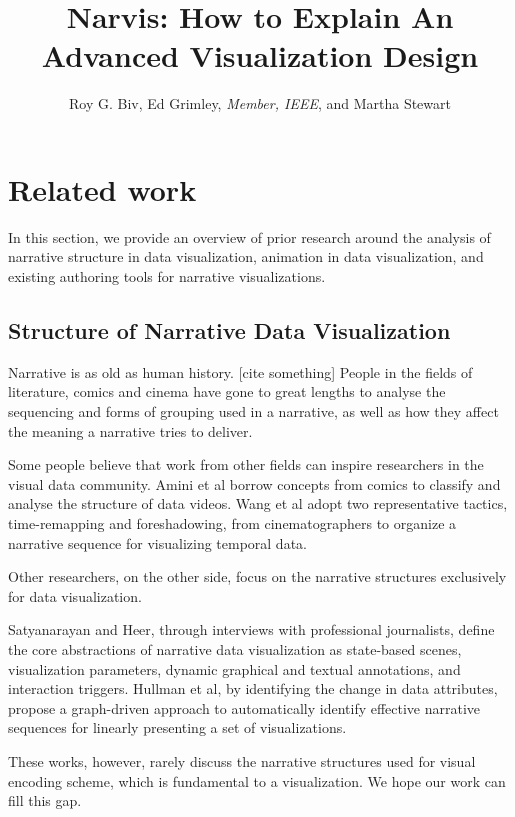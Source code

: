 \documentclass[review,journal]{vgtc}         %
\title{Narvis: How to Explain An Advanced Visualization Design}
\author{Roy G. Biv, Ed Grimley, \textit{Member, IEEE}, and Martha Stewart}
\begin{document}
 


\maketitle
 


\section {Related work}
In this section, we provide an overview of prior research around the analysis of narrative structure in data visualization, animation in data visualization, and existing authoring tools for narrative visualizations.\par
\subsection{Structure of Narrative Data Visualization}
Narrative is as old as human history. [cite something] People in the fields of literature, comics \cite{cohn_visual_2013} and cinema \cite{schmidt_living_2017} have gone to great lengths to analyse the sequencing and forms of grouping used in a narrative, as well as how they affect the meaning a narrative tries to deliver. \par
Some people believe that work from other fields can inspire researchers in the visual data community. Amini et al\cite{amini_understanding_2015} borrow concepts from comics \cite{cohn_visual_2013} to classify and analyse the structure of data videos. Wang et al \cite{wang_animated_2016} adopt two representative tactics, time-remapping and foreshadowing, from cinematographers to organize a narrative sequence for visualizing temporal data. \par
Other researchers, on the other side, focus on the narrative structures exclusively for data visualization. \par
Satyanarayan and Heer, through interviews with professional journalists\cite{satyanarayan_authoring_2014}, define the core abstractions of narrative data visualization as state-based scenes, visualization parameters, dynamic graphical and textual annotations, and interaction triggers. Hullman et al\cite{hullman_deeper_2013}, by identifying the change in data attributes, propose a graph-driven approach to automatically identify effective narrative sequences for linearly presenting a set of visualizations. \par
These works, however, rarely discuss the narrative structures used for visual encoding scheme, which is fundamental to a visualization. We hope our work can fill this gap.\par
\end{document}
